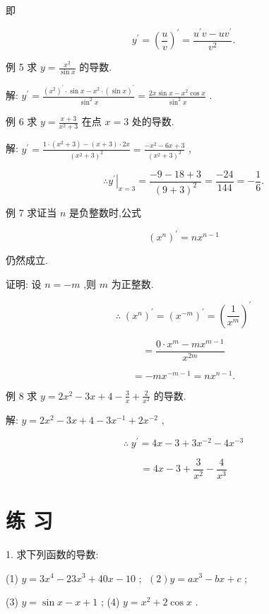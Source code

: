 \documentclass[10pt]{article}
\begin{document}
即

\[
{y}^{\prime } = {\left( \frac{u}{v}\right) }^{\prime } = \frac{{u}^{\prime }v - u{v}^{\prime }}{{v}^{2}}.
\]

例 5 求 \(y = \frac{{x}^{2}}{\sin x}\) 的导数.

解: \({y}^{\prime } = \frac{{\left( {x}^{2}\right) }^{\prime } \cdot \sin x - {x}^{2} \cdot {\left( \sin x\right) }^{\prime }}{{\sin }^{2}x} = \frac{{2x}\sin x - {x}^{2}\cos x}{{\sin }^{2}x}\) .

例 6 求 \(y = \frac{x + 3}{{x}^{2} + 3}\) 在点 \(x = 3\) 处的导数.

解: \({y}^{\prime } = \frac{1 \cdot \left( {{x}^{2} + 3}\right) - \left( {x + 3}\right) \cdot {2x}}{{\left( {x}^{2} + 3\right) }^{2}} = \frac{-{x}^{2} - {6x} + 3}{{\left( {x}^{2} + 3\right) }^{2}}\) ,

\[
\therefore {\left. {y}^{\prime }\right| }_{x = 3} = \frac{-9 - {18} + 3}{{\left( 9 + 3\right) }^{2}} = \frac{-{24}}{144} = - \frac{1}{6}\text{.}
\]

例 7 求证当 \(n\) 是负整数时,公式

\[
{\left( {x}^{n}\right) }^{\prime } = n{x}^{n - 1}
\]

仍然成立.

证明: 设 \(n = - m\) ,则 \(m\) 为正整数.

\[
\therefore \;{\left( {x}^{n}\right) }^{\prime } = {\left( {x}^{-m}\right) }^{\prime } = {\left( \frac{1}{{x}^{m}}\right) }^{\prime }
\]

\[
= \frac{0 \cdot {x}^{m} - m{x}^{m - 1}}{{x}^{2m}}
\]

\[
= - m{x}^{-m - 1} = n{x}^{n - 1}.
\]

例 8 求 \(y = 2{x}^{2} - {3x} + 4 - \frac{3}{x} + \frac{2}{{x}^{2}}\) 的导数.

解: \(y = 2{x}^{2} - {3x} + 4 - 3{x}^{-1} + 2{x}^{-2}\) ,

\[
\therefore \;{y}^{\prime } = {4x} - 3 + 3{x}^{-2} - 4{x}^{-3}
\]

\[
= {4x} - 3 + \frac{3}{{x}^{2}} - \frac{4}{{x}^{3}}
\]

\section*{练 习}

1. 求下列函数的导数:

(1) \(y = 3{x}^{4} - {23}{x}^{3} + {40x} - {10}\) ; \(\;\left( 2\right) y = a{x}^{3} - {bx} + c\) ;

(3) \(y = \sin x - x + 1\) ; (4) \(y = {x}^{2} + 2\cos x\) .
\end{document}
